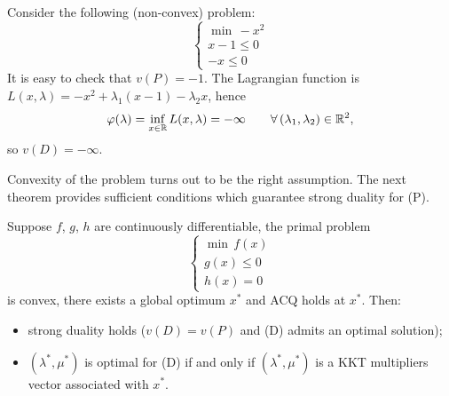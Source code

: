 \begin{example}
    Consider the following (non-convex) problem:
    \[
        \begin{cases}
            \min\, -x^2\\
            x - 1 \le 0\\
            -x \le 0
        \end{cases} \tag{P}
    \]
    It is easy to check that $v(P) = -1$. The Lagrangian function is $L(x, \lambda) = -x^2 + \lambda_1(x - 1) - \lambda_2x$, hence
    \[
        \varphi(\lambda) = \inf_{x \in \mathbb{R}} L(x, \lambda) = -\infty \qquad \forall\, (\lambda_1, \lambda_2) \in \mathbb{R}^2,
    \]
    so $v(D) = -\infty$.
\end{example}

Convexity of the problem turns out to be the right assumption. The next theorem provides sufficient conditions which guarantee strong duality for (P).

\begin{theorem}
    Suppose $f$, $g$, $h$ are continuously differentiable, the primal problem
    \[
        \begin{cases}
            \min\, f(x)\\
            g(x) \le 0\\
            h(x) = 0
        \end{cases} \tag{P}
    \]
    is convex, there exists a global optimum $x^*$ and ACQ holds at $x^*$. Then:
    \begin{itemize}
        \item strong duality holds ($v(D) = v(P)$ and (D) admits an optimal solution);
        \item $(\lambda^*, \mu^*)$ is optimal for (D) if and only if $(\lambda^*, \mu^*)$ is a KKT multipliers vector associated with $x^*$.
    \end{itemize}
\end{theorem}

